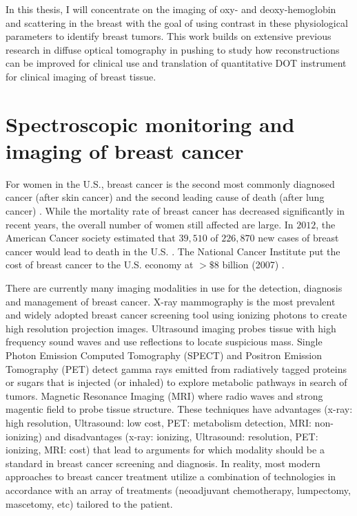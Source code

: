 In this thesis, I will concentrate on the imaging of oxy- and deoxy-hemoglobin and scattering in the breast with the goal of using contrast in these physiological parameters to identify breast tumors. This work builds on extensive previous research in diffuse optical tomography in pushing to study how reconstructions can be improved for clinical use and translation of quantitative DOT instrument for clinical imaging of breast tissue.

\section{Spectroscopic monitoring and imaging of breast cancer}
For women in the U.S., breast cancer is the second most commonly diagnosed cancer (after skin cancer) and the second leading cause of death (after lung cancer) \cite{Ma2013}.  While the mortality rate of breast cancer has decreased significantly in recent years, the overall number of women still affected are large. In $2012$, the American Cancer society estimated that $39,510$ of $226,870$ new cases of breast cancer would lead to death in the U.S. \cite{Jemal2010}. The National Cancer Institute put the cost of breast cancer to the U.S. economy at $>\$8$ billion (2007) \cite{Barron2008}. 

There are currently many imaging modalities in use for the detection, diagnosis and management of breast cancer. X-ray mammography is the most prevalent and widely adopted breast cancer screening tool using ionizing photons to create high resolution projection images. Ultrasound imaging probes tissue with high frequency sound waves and use reflections to locate suspicious mass. Single Photon Emission Computed Tomography (SPECT) and Positron Emission Tomography (PET) detect gamma rays emitted from radiatively tagged proteins or sugars that is injected (or inhaled) to explore metabolic pathways in search of tumors. Magnetic Resonance Imaging (MRI) where radio waves and strong magentic field to probe tissue structure. These techniques have advantages (x-ray: high resolution, Ultrasound: low cost, PET: metabolism detection, MRI: non-ionizing) and disadvantages (x-ray: ionizing, Ultrasound: resolution, PET: ionizing, MRI: cost) that lead to arguments for which modality should be a standard in breast cancer screening and diagnosis. In reality, most modern approaches to breast cancer treatment utilize a combination of technologies in accordance with an array of treatments (neoadjuvant chemotherapy, lumpectomy, mascetomy, etc) tailored to the patient.

